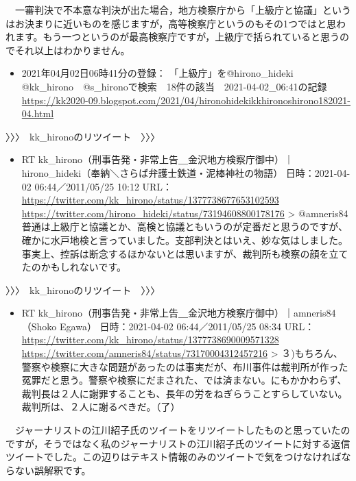 \documentclass[
]{ltjarticle}
\providecommand{\tightlist}{%
  \setlength{\itemsep}{0pt}\setlength{\parskip}{0pt}}
\begin{document}
　一審判決で不本意な判決が出た場合，地方検察庁から「上級庁と協議」というはお決まりに近いものを感じますが，高等検察庁というのもその1つではと思われます。もう一つというのが最高検察庁ですが，上級庁で括られていると思うのでそれ以上はわかりません。

\begin{itemize}
\tightlist
\item
  2021年04月02日06時41分の登録：
  「上級庁」を@hirono\_hideki　@kk\_hirono　@s\_hironoで検索　18件の該当　2021-04-02\_06:41の記録
  \url{https://kk2020-09.blogspot.com/2021/04/hironohidekikkhironoshirono182021-04.html} 
\end{itemize}

〉〉〉　kk\_hironoのリツイート　〉〉〉

\begin{itemize}
\tightlist
\item
  RT
  kk\_hirono（刑事告発・非常上告＿金沢地方検察庁御中）｜hirono\_hideki（奉納＼さらば弁護士鉄道・泥棒神社の物語）
  日時：2021-04-02 06:44／2011/05/25 10:12 URL：
  \url{https://twitter.com/kk\_hirono/status/1377738677653102593} 
  \url{https://twitter.com/hirono\_hideki/status/73194608800178176} 
  \textgreater{} @amneris84
  普通は上級庁と協議とか、高検と協議ともいうのが定番だと思うのですが、確かに水戸地検と言っていました。支部判決とはいえ、妙な気はしました。事実上、控訴は断念するほかないとは思いますが、裁判所も検察の顔を立てたのかもしれないです。
\end{itemize}

〉〉〉　kk\_hironoのリツイート　〉〉〉

\begin{itemize}
\tightlist
\item
  RT
  kk\_hirono（刑事告発・非常上告＿金沢地方検察庁御中）｜amneris84（Shoko
  Egawa） 日時：2021-04-02 06:44／2011/05/25 08:34 URL：
  \url{https://twitter.com/kk\_hirono/status/1377738690009571328} 
  \url{https://twitter.com/amneris84/status/73170004312457216} 
  \textgreater{}
  ３)もちろん、警察や検察に大きな問題があったのは事実だが、布川事件は裁判所が作った冤罪だと思う。警察や検察にだまされた、では済まない。にもかかわらず、裁判長は２人に謝罪することも、長年の労をねぎらうことすらしていない。裁判所は、２人に謝るべきだ。（了）
\end{itemize}

　ジャーナリストの江川紹子氏のツイートをリツイートしたものと思っていたのですが，そうではなく私のジャーナリストの江川紹子氏のツイートに対する返信ツイートでした。この辺りはテキスト情報のみのツイートで気をつけなければならない誤解釈です。
\end{document}

